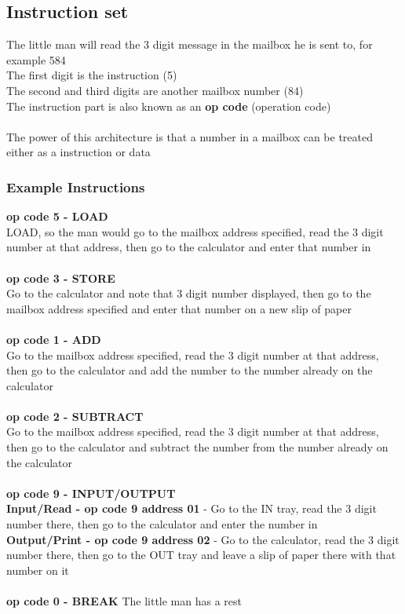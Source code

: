 \documentclass{article}[18pt]
\begin{document}
\subsection{Instruction set}
The little man will read the 3 digit message in the mailbox he is sent to, for example 584\\
The first digit is the instruction (5)\\
The second and third digits are another mailbox number (84)\\
The instruction part is also known as an \textbf{op code} (operation code)\\
\\
The power of this architecture is that a number in a mailbox can be treated either as a instruction or data
\subsubsection{Example Instructions}
\textbf{op code 5 - LOAD}\\
LOAD, so the man would go to the mailbox address specified, read the 3 digit number at that address, then go to the calculator and enter that number in\\
\\
\textbf{op code 3 - STORE}\\
Go to the calculator and note that 3 digit number displayed, then go to the mailbox address specified and enter that number on a new slip of paper\\
\\
\textbf{op code 1 - ADD}\\
Go to the mailbox address specified, read the 3 digit number at that address, then go to the calculator and add the number to the number already on the calculator\\
\\
\textbf{op code 2 - SUBTRACT}\\
Go to the mailbox address specified, read the 3 digit number at that address, then go to the calculator and subtract the number from the number already on the calculator\\
\\
\textbf{op code 9 - INPUT/OUTPUT}\\
\textbf{Input/Read - op code 9 address 01} - Go to the IN tray, read the 3 digit number there, then go to the calculator and enter the number in\\
\textbf{Output/Print - op code 9 address 02} - Go to the calculator, read the 3 digit number there, then go to the OUT tray and leave a slip of paper there with that number on it\\
\\
\textbf{op code 0 - BREAK}
The little man has a rest
\end{document}

